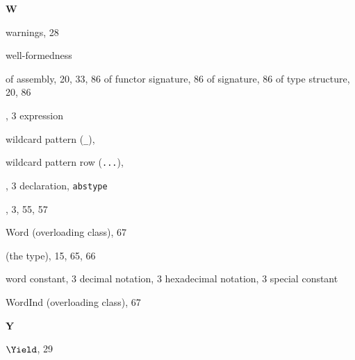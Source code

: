 \begin{theindex}
\parbox{64mm}{\hfil{\large\bf W}\hfil}

\indexspace

\item warnings,  28
\item well-formedness

\subitem of assembly, 20, 33, 86
\subitem of functor signature, 86
\subitem of signature, 86
\subitem of type structure, 20, 86
\item \WHILE, 3
\subitem \seealso expression
\item wildcard pattern (\verb+_+), \underscorewildrefs
\item wildcard pattern row (\verb+...+), \dotdotdotrefs
\item \WITH, 3
\subitem \seealso declaration, {\tt abstype}
\item \WITHTYPE, 3, 55, 57
\item Word (overloading class), 67
\item {} (the type), 15, 65, 66
\item word constant, 3
\subitem decimal notation, 3
\subitem hexadecimal notation, 3
\subitem \seealso special constant
\item WordInd (overloading class), 67
\indexspace

\parbox{64mm}{\hfil{\large\bf Y}\hfil}

\indexspace

\item $\Yield$, 29
\end{theindex}
